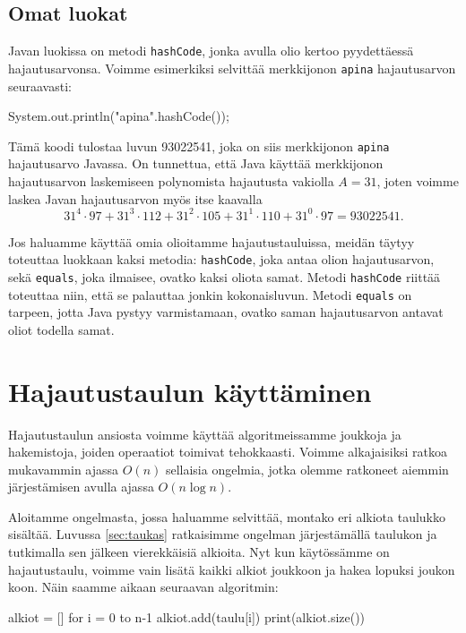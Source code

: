 \subsection{Omat luokat}

Javan luokissa on metodi \texttt{hashCode},
jonka avulla olio kertoo pyydettäessä hajautusarvonsa.
Voimme esimerkiksi selvittää merkkijonon \texttt{apina}
hajautusarvon seuraavasti:

\begin{code}
System.out.println("apina".hashCode());
\end{code}

Tämä koodi tulostaa luvun 93022541,
joka on siis merkkijonon \texttt{apina} hajautusarvo Javassa.
On tunnettua, että Java käyttää merkkijonon hajautusarvon laskemiseen
polynomista hajautusta vakiolla $A=31$,
joten voimme laskea Javan hajautusarvon myös itse kaavalla
\[31^4 \cdot 97+31^3 \cdot 112+31^2 \cdot 105+31^1 \cdot 110+31^0 \cdot 97=93022541.\]

Jos haluamme käyttää omia olioitamme hajautustauluissa,
meidän täytyy toteuttaa luokkaan kaksi metodia:
\texttt{hashCode}, joka antaa olion hajautusarvon,
sekä \texttt{equals},
joka ilmaisee, ovatko kaksi oliota samat.
Metodi \texttt{hashCode} riittää toteuttaa niin,
että se palauttaa jonkin kokonaisluvun.
Metodi \texttt{equals} on tarpeen,
jotta Java pystyy varmistamaan, ovatko saman hajautusarvon
antavat oliot todella samat.

\section{Hajautustaulun käyttäminen}

Hajautustaulun ansiosta voimme käyttää algoritmeissamme
joukkoja ja hakemistoja, joiden operaatiot toimivat tehokkaasti.
Voimme alkajaisiksi ratkoa mukavammin ajassa $O(n)$ sellaisia ongelmia,
jotka olemme ratkoneet aiemmin järjestämisen avulla ajassa $O(n \log n)$.

Aloitamme ongelmasta, jossa haluamme selvittää,
montako eri alkiota taulukko sisältää.
Luvussa \ref{sec:taukas} ratkaisimme ongelman
järjestämällä taulukon ja tutkimalla sen jälkeen
vierekkäisiä alkioita.
Nyt kun käytös\-sämme on hajautustaulu, voimme vain lisätä
kaikki alkiot joukkoon ja hakea lopuksi joukon koon.
Näin saamme aikaan seuraavan algoritmin:

\begin{code}
alkiot = []
for i = 0 to n-1
    alkiot.add(taulu[i])
print(alkiot.size())
\end{code}

